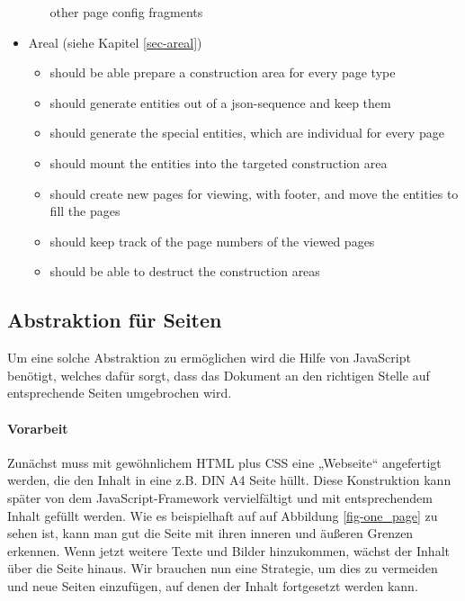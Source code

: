 \begin{itemize}
\begin{itemize}
            other page config fragments
    \end{itemize}
  \item Areal (siehe Kapitel \ref{sec-areal})
    \begin{itemize}
      \item should be able prepare a construction area for every page type
      \item should generate entities out of a json-sequence and keep them
      \item should generate the special entities, which are individual
            for every page
      \item should mount the entities into the targeted construction area
      \item should create new pages for viewing, with footer, and move the
            entities to fill the pages
      \item should keep track of the page numbers of the viewed pages
      \item should be able to destruct the construction areas
    \end{itemize}
\end{itemize}

\subsection{Abstraktion für Seiten}\label{sec-abstrationSeiten}

Um eine solche Abstraktion zu ermöglichen wird die Hilfe von JavaScript
benötigt, welches dafür sorgt, dass das Dokument an den richtigen Stelle auf
entsprechende Seiten umgebrochen wird.

\paragraph{Vorarbeit}
Zunächst muss mit gewöhnlichem HTML plus CSS eine „Webseite“ angefertigt
werden, die den Inhalt in eine z.B. DIN A4 Seite hüllt. Diese Konstruktion
kann später von dem JavaScript-Framework vervielfältigt und mit entsprechendem
Inhalt gefüllt werden. Wie es beispielhaft auf auf Abbildung
\ref{fig-one_page} zu sehen ist,
kann man gut die Seite mit ihren inneren und äußeren
Grenzen erkennen. Wenn jetzt weitere Texte und Bilder
hinzukommen, wächst der Inhalt über die Seite hinaus. Wir brauchen nun
eine Strategie, um dies zu vermeiden und neue Seiten einzufügen, auf denen
der Inhalt fortgesetzt werden kann.

